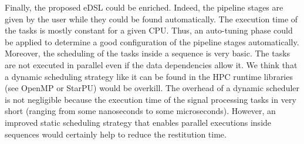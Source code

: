Finally, the proposed eDSL could be enriched. Indeed, the pipeline stages are
given by the user while they could be found automatically. The execution time of
the tasks is mostly constant for a given CPU. Thus, an auto-tuning phase could
be applied to determine a good configuration of the pipeline stages
automatically. Moreover, the scheduling of the tasks inside a sequence is very
basic. The tasks are not executed in parallel even if the data dependencies
allow it. We think that a dynamic scheduling strategy like it can be found in
the HPC runtime libraries (see OpenMP or StarPU) would be overkill. The overhead
of a dynamic scheduler is not negligible because the execution time of the
signal processing tasks in very short (ranging from some nanoseconds to some
microseconds). However, an improved static scheduling strategy that enables
parallel executions inside sequences would certainly help to reduce the
restitution time.
